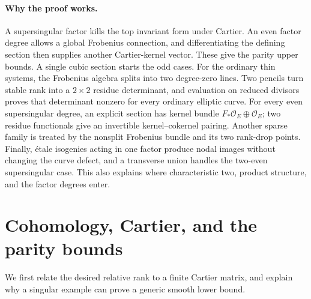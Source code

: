 \documentclass[11pt]{article}
\theoremstyle{definition}\newtheorem{definition}[theorem]{Definition}
\theoremstyle{remark}\newtheorem{remark}[theorem]{Remark}
\newcommand{\OO}{\mathcal O}
\begin{document}
\paragraph{Why the proof works.}
A supersingular factor kills the top invariant form under Cartier. An even factor degree allows a global Frobenius connection, and differentiating the defining section then supplies another Cartier-kernel vector. These give the parity upper bounds. A single cubic section starts the odd cases. For the ordinary thin systems, the Frobenius algebra splits into two degree-zero lines. Two pencils turn stable rank into a $2\times2$ residue determinant, and evaluation on reduced divisors proves that determinant nonzero for every ordinary elliptic curve. For every even supersingular degree, an explicit section has kernel bundle $F_*\OO_E\oplus\OO_E$; two residue functionals give an invertible kernel--cokernel pairing. Another sparse family is treated by the nonsplit Frobenius bundle and its two rank-drop points. Finally, \'etale isogenies acting in one factor produce nodal images without changing the curve defect, and a transverse union handles the two-even supersingular case. This also explains where characteristic two, product structure, and the factor degrees enter.

\section{Cohomology, Cartier, and the parity bounds}\label{sec:cohom}

We first relate the desired relative rank to a finite Cartier matrix, and explain why a singular example can prove a generic smooth lower bound.
\end{document}
